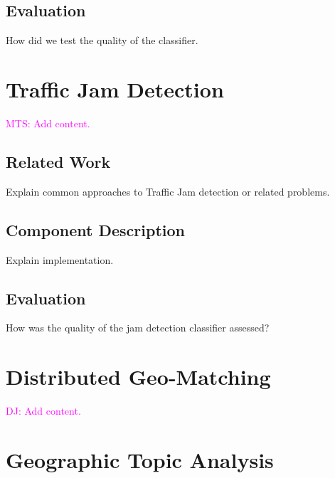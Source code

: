 \documentclass[external]{20120615_deliverable_template_ukob}
\theoremstyle{definition}
\newcommand{\todo}[2]{\textcolor{magenta}{#1: #2}}
\begin{document}
\subsection{Evaluation}
How did we test the quality of the classifier.

\section{Traffic Jam Detection}
\todo{MTS}{Add content.}

\subsection{Related Work}
Explain common approaches to Traffic Jam detection or related problems.

\subsection{Component Description}
Explain implementation. 

\subsection{Evaluation}
How was the quality of the jam detection classifier assessed?

\section{Distributed Geo-Matching}
\todo{DJ}{Add content.}


\section{Geographic Topic Analysis}



\end{document}
